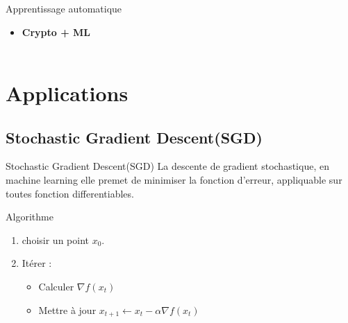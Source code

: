 \documentclass{beamer}
\begin{document}
  \begin{frame}{Apprentissage automatique}

    \begin{itemize}
    \item<1-> {
      \textbf{Crypto + ML}\\
       \\
              }
  \end{itemize}
  \end{frame}
\section{Applications}
\subsection{Stochastic Gradient Descent(SGD)}
  \begin{frame}{Stochastic Gradient Descent(SGD)}
La descente de gradient stochastique, en machine learning elle premet de minimiser la fonction d'erreur, appliquable sur toutes fonction differentiables.\newline
\begin{block}{Algorithme}
\begin{enumerate}
	\item{choisir un point $x_0$.}
	\item{Itérer : 
\begin{itemize}
	\item{Calculer $\nabla f(x_t)$ }
	\item{Mettre à jour $x_{t+1}\leftarrow x_t - \alpha \nabla f(x_t)$}
\end{itemize}
	}
\end{enumerate}
\end{block}
\end{frame}
\end{document}

